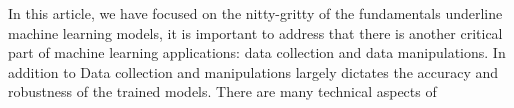 In this article, we have focused on the nitty-gritty of the fundamentals underline machine learning models, it is important to address that there is another critical part of machine learning applications: data collection and data manipulations. In addition to Data collection and manipulations largely dictates the accuracy and robustness of the trained models. There are many technical aspects of 